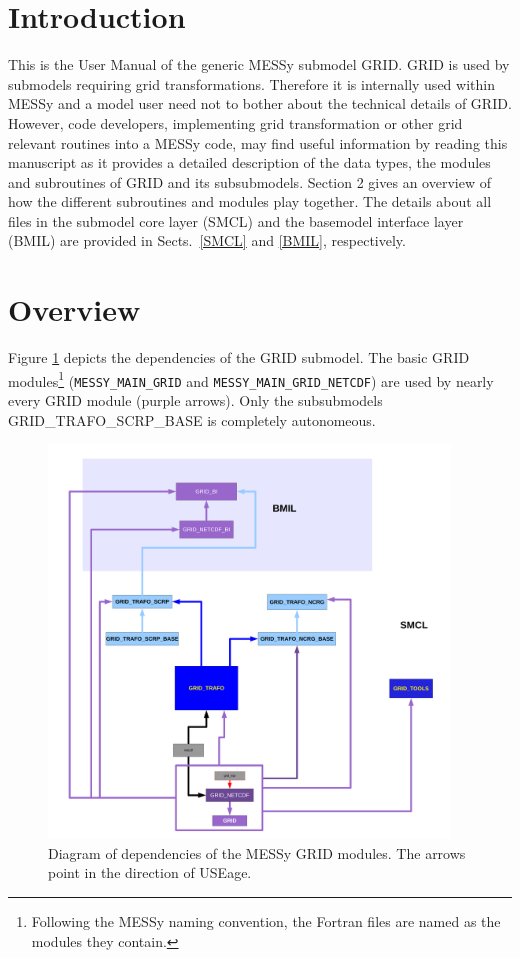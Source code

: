 \documentclass[11pt,twoside]{article}
\begin{document}
 \section{Introduction}
This is the User Manual of the generic MESSy submodel GRID. GRID is
 used by submodels requiring grid transformations.
Therefore it is internally used within MESSy and a model user need not
to bother about the technical details of GRID.
However, code developers, implementing grid transformation or other
grid relevant routines into a MESSy code, may find useful information
by reading this manuscript 
as it provides a detailed description of the data
types, the modules and subroutines of GRID and its subsubmodels.
Section 2 gives an overview of how the different subroutines and
modules play together.
The details about all files in the submodel core layer
(SMCL) and the basemodel interface layer (BMIL)  are provided in
 Sects.~\ref{SMCL} and \ref{BMIL}, respectively.

\section{Overview\label{overview}}
Figure \ref{FigGRIDFLOW} depicts the dependencies of the GRID submodel.
The basic GRID modules\footnote{Following the MESSy naming convention,
the Fortran files are named as the modules they contain.}
(\verb|MESSY_MAIN_GRID| and \verb|MESSY_MAIN_GRID_NETCDF|)
 are used by nearly every GRID module (purple arrows). Only the 
subsubmodels GRID\_TRAFO\_SCRP\_BASE is completely autonomeous.
\begin{figure}
\includegraphics[width=0.95\textwidth]{grid_modules.pdf}
\caption{Diagram of dependencies of the MESSy GRID modules. The
arrows point in the direction of USEage.\label{FigGRIDFLOW}}
\end{figure}
\end{document}
